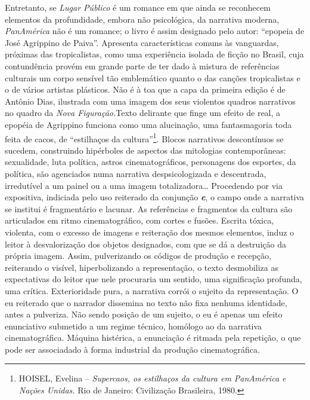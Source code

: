 Entretanto, se \emph{Lugar Público} é um romance em que ainda se
reconhecem elementos da profundidade, embora não psicológica, da
narrativa moderna, \emph{PanAmérica} não é um romance; o livro é assim
designado pelo autor: ``epopeia de José Agrippino de Paiva''. Apresenta
características comuns às vanguardas, próximas das tropicalistas, como
uma experiência isolada de ficção no Brasil, cuja contundência provém em
grande parte de ter dado à mistura de referências culturais um corpo
sensível tão emblemático quanto o das canções tropicalistas e o de
vários artistas plásticos. Não é à toa que a capa da primeira edição é
de Antônio Dias, ilustrada com uma imagem dos seus violentos quadros
narrativos no quadro da \emph{Nova Figuração.}Texto delirante que finge
um efeito de real, a epopéia de Agrippino funciona como uma alucinação,
uma fantasmagoria toda feita de cacos, de ``estilhaços da
cultura''\footnote{\textsc{HOISEL}, Evelina -- \emph{Supercaos, os estilhaços da
  cultura em PanAmérica e Nações Unidas.} Rio de Janeiro: Civilização
  Brasileira, 1980.}. Blocos narrativos descontínuos se sucedem,
construindo hipérboles de aspectos das mitologias contemporâneas:
sexualidade, luta política, astros cinematográficos, personagens dos
esportes, da política, são agenciados numa narrativa despsicologizada e
descentrada, irredutível a um painel ou a uma imagem totalizadora\ldots{}
Procedendo por via expositiva, indiciada pelo uso reiterado da conjunção
\textbf{\emph{e}}, o campo onde a narrativa se institui é fragmentário e
lacunar. As referências e fragmentos da cultura são articulados em ritmo
cinematográfico, com cortes e fusões. Escrita tóxica, violenta, com o
excesso de imagens e reiteração dos mesmos elementos, induz o leitor à
desvalorização dos objetos designados, com que se dá a destruição da
própria imagem. Assim, pulverizando os códigos de produção e recepção,
reiterando o visível, hiperbolizando a representação, o texto
desmobiliza as expectativas do leitor que nele procuraria um sentido,
uma significação profunda, uma crítica. Exterioridade pura, a narrativa
corrói o sujeito da representação. O eu reiterado que o narrador
dissemina no texto não fixa nenhuma identidade, antes a pulveriza. Não
sendo posição de um sujeito, o eu é apenas um efeito enunciativo
submetido a um regime técnico, homólogo ao da narrativa cinematográfica.
Máquina histérica, a enunciação é ritmada pela repetição, o que pode ser
associadado à forma industrial da produção cinematográfica.

